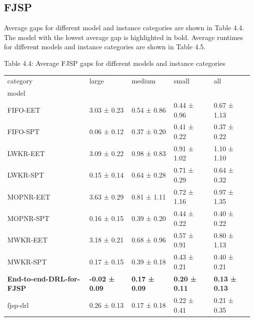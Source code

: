\subsection{FJSP}

Average gaps for different model and instance categories are shown in Table 4.4. The model with the lowest average gap is highlighted in bold. Average runtimes for different models and instance categories are shown in Table 4.5.

\begin{table}[H]
    Table 4.4: Average FJSP gaps for different models and instance categories\\
    \vspace{1mm}
    \footnotesize 
    \begin{tabular}{lllll}
        \toprule
        category & large & medium & small & all \\
        model &  &  &  &  \\
        \midrule
        FIFO-EET & 3.03 ± 0.23 & 0.54 ± 0.86 & 0.44 ± 0.96 & 0.67 ± 1.13 \\
        FIFO-SPT & 0.06 ± 0.12 & 0.37 ± 0.20 & 0.41 ± 0.22 & 0.37 ± 0.22 \\
        LWKR-EET & 3.09 ± 0.22 & 0.98 ± 0.83 & 0.91 ± 1.02 & 1.10 ± 1.10 \\
        LWKR-SPT & 0.15 ± 0.14 & 0.64 ± 0.28 & 0.71 ± 0.29 & 0.64 ± 0.32 \\
        MOPNR-EET & 3.63 ± 0.29 & 0.81 ± 1.11 & 0.72 ± 1.16 & 0.97 ± 1.35 \\
        MOPNR-SPT & 0.16 ± 0.15 & 0.39 ± 0.20 & 0.44 ± 0.22 & 0.40 ± 0.22 \\
        MWKR-EET & 3.18 ± 0.21 & 0.68 ± 0.96 & 0.57 ± 0.91 & 0.80 ± 1.13 \\
        MWKR-SPT & 0.17 ± 0.15 & 0.39 ± 0.18 & 0.43 ± 0.21 & 0.40 ± 0.21 \\
        \textbf{End-to-end-DRL-for-FJSP} & \textbf{-0.02 ± 0.09} & \textbf{0.17 ± 0.09} & \textbf{0.20 ± 0.11} & \textbf{0.13 ± 0.13} \\
        fjsp-drl & 0.26 ± 0.13 & 0.17 ± 0.18 & 0.22 ± 0.41 & 0.21 ± 0.35 \\
        \bottomrule
    \end{tabular}
\end{table}

